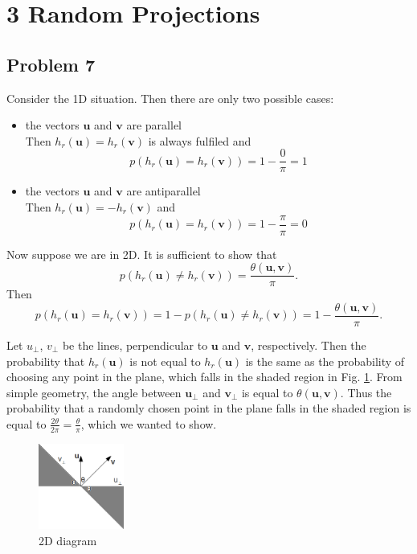 \section*{3 Random Projections}

\subsection*{Problem 7}

Consider the 1D situation. Then there are only two possible cases:

\begin{itemize}
  \item the vectors $\mathbf{u}$ and $\mathbf{v}$ are parallel\\
Then $h_r(\mathbf{u}) = h_r(\mathbf{v})$ is always fulfiled and 
\[p(h_r(\mathbf{u}) = h_r(\mathbf{v})) = 1-\frac{0}{\pi} = 1\]
  \item the vectors $\mathbf{u}$ and $\mathbf{v}$ are antiparallel\\
Then $h_r(\mathbf{u}) = - h_r(\mathbf{v})$ and 
\[p(h_r(\mathbf{u}) = h_r(\mathbf{v})) = 1-\frac{\pi}{\pi} = 0\]
\end{itemize}

Now suppose we are in 2D. It is sufficient to show that \[p\left(h_r(\mathbf{u}) \neq h_r(\mathbf{v})\right)=\frac{\theta(\mathbf{u}, \mathbf{v})}{\pi}.\] Then \[p\left(h_r(\mathbf{u}) = h_r(\mathbf{v})\right) = 1-p\left(h_r(\mathbf{u}) \neq h_r(\mathbf{v})\right) = 1 - \frac{\theta(\mathbf{u}, \mathbf{v})}{\pi}.\]

Let $u_\perp$, $v_\perp$ be the lines, perpendicular to $\mathbf{u}$ and $\mathbf{v}$, respectively. Then the probability that $h_r(\mathbf{u})$ is not equal to $h_r(\mathbf{u})$ is the same as the probability of choosing any point in the plane, which falls in the shaded region in Fig. \ref{fig:theta}. From simple geometry, the angle between $\mathbf{u_\perp}$ and $\mathbf{v_\perp}$ is equal to $\theta(\mathbf{u,v})$. Thus the probability that a randomly chosen point in the plane falls in the shaded region is equal to $\frac{2\theta}{2\pi}=\frac{\theta}{\pi}$, which we wanted to show.
\begin{figure}[!h]
  \begin{center}
    \includegraphics[width=0.25\textwidth]{plots/3.png}
    \caption{2D diagram}
    \label{fig:theta}
  \end{center}
\end{figure}

